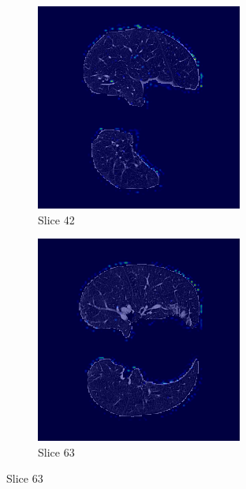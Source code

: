 
\begin{figure}[!htbp]
\centering
\begin{subfigure}[b]{0.45\textwidth}
    \includegraphics[width=\textwidth]{img/label1_fallo_pred0_pid87MASSN_slice_42.png}
    \caption{Slice 42}
\end{subfigure}
\hfill
\begin{subfigure}[b]{0.45\textwidth}
    \includegraphics[width=\textwidth]{img/label1_fallo_pred0_pid87MASSN_slice_63.png}
    \caption{Slice 63}
\end{subfigure}


\end{figure}
